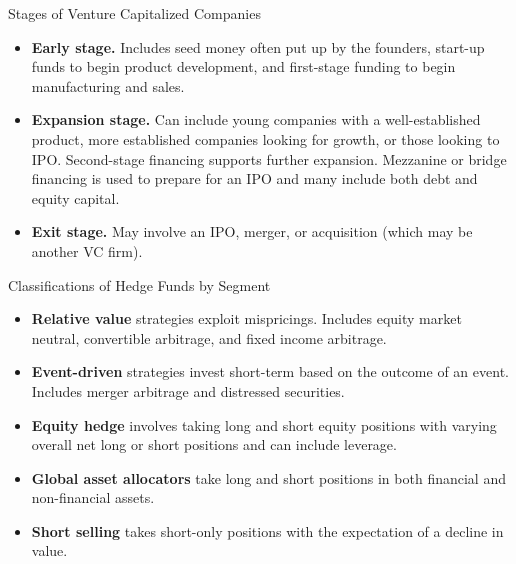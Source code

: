 \documentclass[../custom]{flashcards}
\begin{document}
\begin{flashcard}[\studyArea]{Stages of Venture Capitalized Companies}
    \begin{itemize}
        \item \textbf{Early stage.} Includes seed money often put up by the founders, start-up funds to begin product development, and first-stage funding to begin manufacturing and sales.
        \item \textbf{Expansion stage.} Can include young companies with a well-established product, more established companies looking for growth, or those looking to IPO\@. Second-stage financing supports further expansion. Mezzanine or bridge financing is used to prepare for an IPO and many include both debt and equity capital.
        \item \textbf{Exit stage.} May involve an IPO, merger, or acquisition (which may be another VC firm).
    \end{itemize}
\end{flashcard}

\begin{flashcard}[\studyArea]{Classifications of Hedge Funds by Segment}
    \begin{itemize}
        \item \textbf{Relative value} strategies exploit mispricings. Includes equity market neutral, convertible arbitrage, and fixed income arbitrage.
        \item \textbf{Event-driven} strategies invest short-term based on the outcome of an event. Includes merger arbitrage and distressed securities.
        \item \textbf{Equity hedge} involves taking long and short equity positions with varying overall net long or short positions and can include leverage.
        \item \textbf{Global asset allocators} take long and short positions in both financial and non-financial assets.
        \item \textbf{Short selling} takes short-only positions with the expectation of a decline in value.
    \end{itemize}
\end{flashcard}

\renewcommand{\studyArea}{Risk Management}
\end{document}
